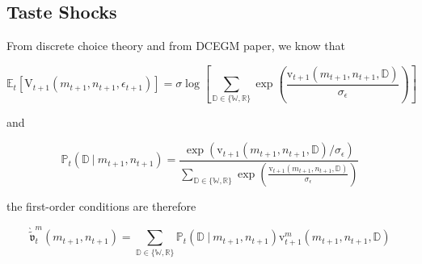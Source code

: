 \documentclass{article}
\newcommand{\VFunc}{\mathrm{V}}
\newcommand{\Ex}{\mathbb{E}}
\newcommand{\vFunc}{\mathrm{v}}
\newcommand{\mRat}{m}
\newcommand{\vOptAlt}{\grave{\tilde{\mathfrak{v}}}}
\newcommand{\nRat}{n}
\newcommand{\Retire}{\mathbb{R}}
\newcommand{\Work}{\mathbb{W}}
\newcommand{\error}{\epsilon}
\newcommand{\Decision}{\mathbb{D}}
\newcommand{\Prob}{\mathbb{P}}
\begin{document}
\subsection{Taste Shocks}\label{Taste Shocks}

From discrete choice theory and from DCEGM paper, we know that

\begin{equation}
\Ex_{t} \left[
        \VFunc_{t+1}(\mRat_{t+1}, \nRat_{t+1}, \error_{t+1}) \right] =
    \sigma \log \left[ \sum_{\Decision \in \{\Work, \Retire\}} \exp \left(
        \frac{\vFunc_{t+1}(\mRat_{t+1}, \nRat_{t+1},
            \Decision)}{\sigma_\error} \right)  \right]
\end{equation}

and

\begin{equation}
\Prob_{t}(\Decision ~ \lvert ~ \mRat_{t+1}, \nRat_{t+1}) = \frac{\exp
        \left(
        \vFunc_{t + 1}(\mRat_{t+1}, \nRat_{t+1}, \Decision) /
        \sigma_\error
        \right)
    }{  \sum\limits_{\Decision \in \{\Work, \Retire\}} \exp \left(
        \frac{\vFunc_{t+1}(\mRat_{t+1}, \nRat_{t+1},
            \Decision)}{\sigma_\error} \right)}
\end{equation}

the first-order conditions are therefore

\begin{equation}
\vOptAlt_{t}^{\mRat}(\mRat_{t+1}, \nRat_{t+1}) = \sum_{\Decision \in
        \{\Work, \Retire\}} \Prob_{t}(\Decision ~
    \lvert ~
    \mRat_{t+1}, \nRat_{t+1}) \vFunc_{t+1}^{\mRat}(\mRat_{t+1},
    \nRat_{t+1},
    \Decision)
\end{equation}





\end{document}
